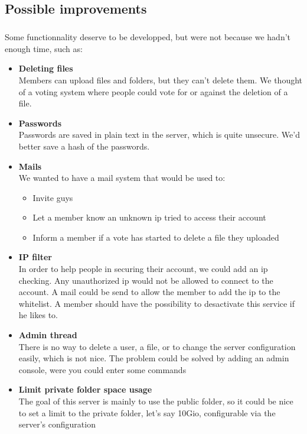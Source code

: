 \documentclass[12pt,a4paper,twoside]{article}
\begin{document}
		\subsection{Possible improvements} %
			\subparagraph*{}
				Some functionnality deserve to be developped, but were not because we hadn't enough time, such as:
				\begin{itemize}
					\item{} \textbf{Deleting files}\\
						Members can upload files and folders, but they can't delete them. We thought of a voting system where people could vote for or against the deletion of a file.
					\item{} \textbf{Passwords}\\
						Passwords are saved in plain text in the server, which is quite unsecure. We'd better save a hash of the passwords.
					\item{} \textbf{Mails}\\
						We wanted to have a mail system that would be used to:
						\begin{itemize}
							\item{} Invite guys
							\item{} Let a member know an unknown ip tried to access their account
							\item{} Inform a member if a vote has started to delete a file they uploaded
						\end{itemize}
					\item{} \textbf{IP filter}\\
						In order to help people in securing their account, we could add an ip checking. Any unauthorized ip would not be allowed to connect to the account. A mail could be send to allow the member to add the ip to the whitelist. A member should have the possibility to desactivate this service if he likes to.
					\item{} \textbf{Admin thread}\\
						There is no way to delete a user, a file, or to change the server configuration easily, which is not nice. The problem could be solved by adding an admin console, were you could enter some commands
					\item{} \textbf{Limit private folder space usage}\\
						The goal of this server is mainly to use the public folder, so it could be nice to set a limit to the private folder, let's say 10Gio, configurable via the server's configuration
				\end{itemize}
\end{document}
